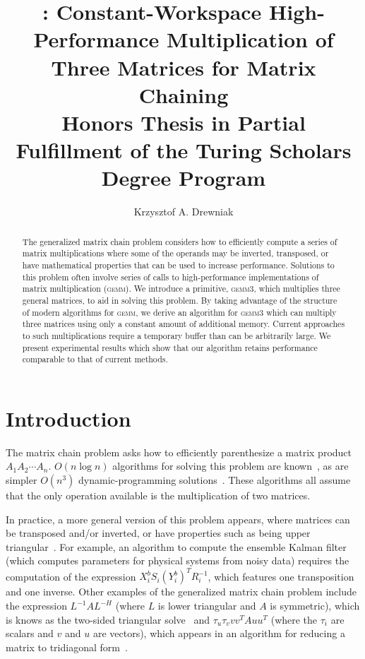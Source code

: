 \documentclass[12pt]{article}
\title{\gemmt{}: Constant-Workspace High-Performance Multiplication of Three Matrices for Matrix Chaining\\
{\large Honors Thesis in Partial Fulfillment of the Turing Scholars Degree Program}}
\author{Krzysztof A. Drewniak}
\newcommand*{\gemmt}{{\textsc{gemm3}}}
\newcommand*{\gemm}{{\textsc{gemm}}}
\newcommand*{\mycite}[1]{~\cite{#1}}
\begin{document}
\maketitle{}
\begin{abstract}
  The generalized matrix chain problem considers how to efficiently compute a series of matrix multiplications where some of the operands may be inverted, transposed, or have mathematical properties that can be used to increase performance.
  Solutions to this problem often involve series of calls to high-performance implementations of matrix multiplication (\gemm{}).
  We introduce a primitive, \gemmt{}, which multiplies three general matrices, to aid in solving this problem.
  By taking advantage of the structure of modern algorithms for \gemm{}, we derive an algorithm for \gemmt{} which can multiply three matrices using only a constant amount of additional memory.
  Current approaches to such multiplications require a temporary buffer than can be arbitrarily large.
  We present experimental results which show that our algorithm retains performance comparable to that of current methods.
\end{abstract}

\section{Introduction}
The matrix chain problem asks how to efficiently parenthesize a matrix product $A_1A_2\cdots A_n$.
$O(n \log n)$ algorithms for solving this problem are known\mycite{Hu1984}, as are simpler $O(n^3)$ dynamic-programming solutions\mycite{Barthels2018}.
These algorithms all assume that the only operation available is the multiplication of two matrices.

In practice, a more general version of this problem appears, where matrices can be transposed and/or inverted, or have properties such as being upper triangular\mycite{Barthels2018}.
For example, an algorithm to compute the ensemble Kalman filter\mycite{Rao2017} (which computes parameters for physical systems from noisy data) requires the computation of the expression $X_i^b S_i (Y_i^b)^T R_i^{-1}$, which features one transposition and one inverse.
Other examples of the generalized matrix chain problem include the expression $L^{-1}AL^{-H}$ (where $L$ is lower triangular and $A$ is symmetric), which is knows as the two-sided triangular solve\mycite{Parikh2017} and $\tau_u\tau_v vv^TAuu^T$ (where the $\tau_i$ are scalars and $v$ and $u$ are vectors), which appears in an algorithm for reducing a matrix to tridiagonal form\mycite{Choi1995}.
\end{document}
